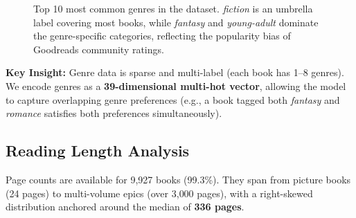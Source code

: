 \documentclass[12pt, a4paper]{article}
\begin{document}
\begin{figure}[H]
\centering
{}
\caption{Top 10 most common genres in the dataset. \emph{fiction} is an umbrella label
covering most books, while \emph{fantasy} and \emph{young-adult} dominate the genre-specific
categories, reflecting the popularity bias of Goodreads community ratings.}
\end{figure}

\begin{insightbox}
\textbf{Key Insight:} Genre data is sparse and multi-label (each book has 1--8 genres).
We encode genres as a \textbf{39-dimensional multi-hot vector}, allowing the model to
capture overlapping genre preferences (e.g., a book tagged both \emph{fantasy} and
\emph{romance} satisfies both preferences simultaneously).
\end{insightbox}

\subsection{Reading Length Analysis}

Page counts are available for 9{,}927 books (99.3\%). They span from picture books
(24 pages) to multi-volume epics (over 3{,}000 pages), with a right-skewed distribution
anchored around the median of \textbf{336 pages}.
\end{document}
